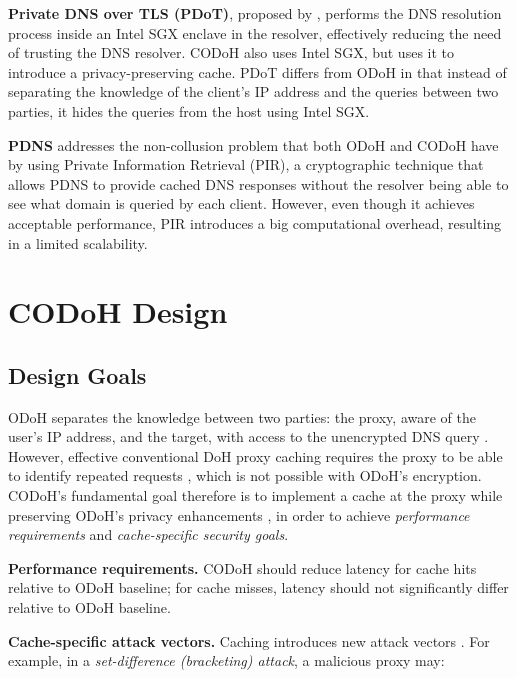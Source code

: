 \documentclass[a4paper]{article}
\begin{document}
\textbf{Private DNS over TLS (PDoT)}, proposed by \citet{pdot}, performs the DNS resolution process inside an Intel SGX enclave in the resolver, effectively reducing the need of trusting the DNS resolver. CODoH also uses Intel SGX, but uses it to introduce a privacy-preserving cache. PDoT differs from ODoH in that instead of separating the knowledge of the client's IP address and the queries between two parties, it hides the queries from the host using Intel SGX.

\textbf{PDNS} \citep{xiao2025collusionresistantdnsprivate} addresses the non-collusion problem that both ODoH and CODoH have by using Private Information Retrieval (PIR), a cryptographic technique that allows PDNS to provide cached DNS responses without the resolver being able to see what domain is queried by each client. However, even though it achieves acceptable performance, PIR introduces a big computational overhead, resulting in a limited scalability.

\section{CODoH Design}
\label{sec:main}

\subsection{Design Goals}
\label{sec:designgoals}

ODoH separates the knowledge between two parties: the proxy, aware of the user's IP address, and the target, with access to the unencrypted DNS query  \citep{singanamalla2020oblivious}. However, effective conventional DoH proxy caching requires the proxy to be able to identify repeated requests \citep{rfc8484}, which is not possible with ODoH's encryption. CODoH's fundamental goal therefore is to implement a cache at the proxy while preserving ODoH's privacy enhancements \citep{niroula2026codoh}, in order to achieve \textit{performance requirements} and \textit{cache-specific security goals}.

\textbf{Performance requirements.} CODoH should reduce latency for cache hits relative to ODoH baseline; for cache misses, latency should not significantly differ relative to ODoH baseline. \citep{niroula2026codoh}

\textbf{Cache-specific attack vectors.} Caching introduces new attack vectors \citep{niroula2026codoh}. For example, in a \textit{set-difference (bracketing) attack}, a malicious proxy may:
\end{document}
